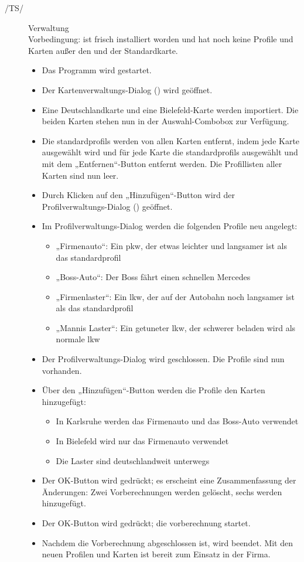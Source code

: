 \documentclass[a4paper, 11pt]{article}
\makeatletter
\def\namedlabel#1#2{\begingroup
    #2%
    \def\@currentlabel{#2}%
    \phantomsection\label{#1}\endgroup
}
\newcommand{\oitem}[2]{
  \@ifundefined{c@oitem#1}{\newcounter{oitem#1}}{} %
  \addtocounter{oitem#1}{10}
  \item[\namedlabel{#1:#2}{/#1\arabic{oitem#1}/}]
}
\makeatother
\begin{document}
\begin{description}
\oitem{TS}{verwaltung} Verwaltung\\
Vorbedingung: \routeKIT ist frisch installiert worden und hat noch keine Profile und Karten außer den  und der Standardkarte.
\begin{itemize}
\item Das Programm \routeKIT wird gestartet.
\item Der Kartenverwaltungs-Dialog () wird geöffnet.
\item Eine Deutschlandkarte und eine Bie\-le\-feld-Karte werden importiert. Die beiden Karten stehen nun in der Auswahl-Combobox zur Verfügung.
\item Die \glspl{standardprofil} werden von allen Karten entfernt, indem jede Karte ausgewählt wird und für jede Karte die \glspl{standardprofil} ausgewählt und mit dem „Entfernen“-Button entfernt werden. Die Profillisten aller Karten sind nun leer.
\item Durch Klicken auf den „Hinzufügen“-Button wird der Profilverwaltungs-Dialog () geöffnet.
\item Im Profilverwaltungs-Dialog werden die folgenden Profile neu angelegt:
  \begin{itemize}
  \item „Firmenauto“: Ein \gls{pkw}, der etwas leichter und langsamer ist als das \gls{standardprofil}
  \item „Boss-Auto“: Der Boss fährt einen schnellen Mercedes
  \item „Firmenlaster“: Ein \gls{lkw}, der auf der Autobahn noch langsamer ist als das \gls{standardprofil}
  \item „Mannis Laster“: Ein getuneter \gls{lkw}, der schwerer beladen wird als normale \gls{lkw}
  \end{itemize}
\item Der Profilverwaltungs-Dialog wird geschlossen. Die Profile sind nun vorhanden.
\item Über den „Hinzufügen“-Button werden die Profile den Karten hinzugefügt:
  \begin{itemize}
  \item In Karlsruhe werden das Firmenauto und das Boss-Auto verwendet
  \item In Bielefeld wird nur das Firmenauto verwendet
  \item Die Laster sind deutschlandweit unterwegs
  \end{itemize}
\item Der OK-Button wird gedrückt; es erscheint eine Zusammenfassung der Änderungen: Zwei Vorberechnungen werden gelöscht, sechs werden hinzugefügt.
\item Der OK-Button wird gedrückt; die \gls{vorberechnung} startet.
\item Nachdem die Vorberechnung abgeschlossen ist, wird \routeKIT beendet. Mit den neuen Profilen und Karten ist \routeKIT bereit zum Einsatz in der Firma.
\end{itemize}
\end{description}
\end{document}
